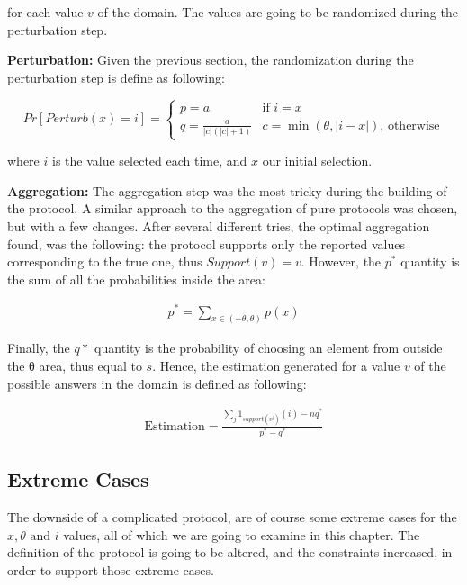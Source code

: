 for each value $v$ of the domain. The values are going to be randomized during the perturbation step.

\textbf{Perturbation:} Given the previous section, the randomization during the perturbation step is define as following:

\begin{equation*}
    Pr[Perturb(x) = i] =
	\begin{cases}
		p = a & \mbox{if } i = x \\
		q = \frac{a}{|c|(|c| + 1)}  &  c = \min{(\theta, |i-x|)}  \mbox{, otherwise}	\end{cases}
\end{equation*}
 
where $i$ is the value selected each time, and $x$ our initial selection. 

\textbf{Aggregation:} The aggregation step was the most tricky during the building of the protocol. A similar approach to the aggregation of pure protocols was chosen, but with a few changes. After several different tries, the optimal aggregation found, was the following: the protocol supports only the reported values corresponding to the true one, thus $Support(v) = v$. However, the $p^*$ quantity is the sum of all the probabilities inside the area: 

\begin{align*}
    p^* = \sum_{x\in (-\theta, \theta)} p(x)
\end{align*}

Finally, the $q*$ quantity is the probability of choosing an element from outside the θ area, thus equal to $s$. Hence, the estimation generated for a value $v$ of the possible answers in the domain is defined as following:

\begin{align*}
    \text{Estimation} = \frac{\sum_{j} 1_{support(v^j)}(i) - nq^*}{p^* - q^*}
\end{align*}

\subsection{Extreme Cases}

The downside of a complicated protocol, are of course some extreme cases for the $x, \theta \text{ and } i$ values, all of which we are going to examine in this chapter. The definition of the protocol is going to be altered, and the constraints increased, in order to support those extreme cases.

